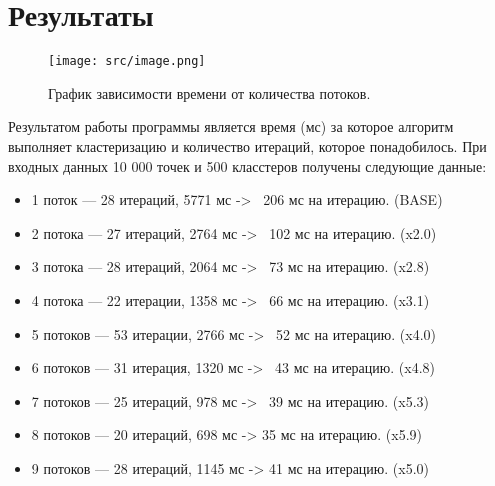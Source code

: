 \section{Результаты}

\begin{figure}[H]
    \centering
    \texttt{[image: src/image.png]}
    \caption{График зависимости времени от количества потоков.}
    \label{fig:graph}
\end{figure}

Результатом работы программы является время (мс) за которое алгоритм выполняет кластеризацию и количество итераций, которое понадобилось.
При входных данных 10 000 точек и 500 класстеров получены следующие данные:
\begin{itemize}
\item 1 поток --- 28 итераций, 5771 мс -> ~206 мс на итерацию. (BASE)
\item 2 потока --- 27 итераций, 2764 мс -> ~102 мс на итерацию. (x2.0)
\item 3 потока --- 28 итераций, 2064 мс -> ~73 мс на итерацию. (x2.8)
\item 4 потока --- 22 итерации, 1358 мс -> ~66 мс на итерацию. (x3.1)
\item 5 потоков --- 53 итерации, 2766 мс -> ~52 мс на итерацию. (x4.0)
\item 6 потоков --- 31 итерация, 1320 мс -> ~43 мс на итерацию. (x4.8)
\item 7 потоков --- 25 итераций, 978 мс -> ~39 мс на итерацию. (x5.3)
\item 8 потоков --- 20 итераций, 698 мс -> 35 мс на итерацию. (x5.9)
\item 9 потоков --- 28 итераций, 1145 мс -> 41 мс на итерацию. (x5.0)
\end{itemize}
